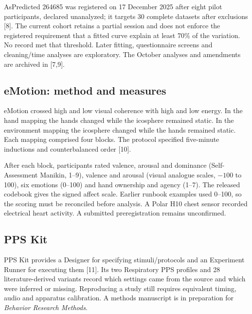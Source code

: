 AsPredicted 264685 was registered on 17 December 2025 after eight pilot participants, declared unanalyzed; it targets 30 complete datasets after exclusions [8]. The current cohort retains a partial session and does not enforce the registered requirement that a fitted curve explain at least 70\% of the variation. No record met that threshold. Later fitting, questionnaire screens and cleaning/time analyses are exploratory. The October analyses and amendments are archived in [7,9].

\subsection{eMotion: method and measures}
\label{sec:s6-methods}
eMotion crossed high and low visual coherence with high and low energy. In the hand mapping the hands changed while the icosphere remained static. In the environment mapping the icosphere changed while the hands remained static. Each mapping comprised four blocks. The protocol specified five-minute inductions and counterbalanced order [10].

After each block, participants rated valence, arousal and dominance (Self-Assessment Manikin, 1--9), valence and arousal (visual analogue scales, $-100$ to 100), six emotions (0--100) and hand ownership and agency (1--7). The released codebook gives the signed affect scale. Earlier runbook examples used 0--100, so the scoring must be reconciled before analysis. A Polar H10 chest sensor recorded electrical heart activity. A submitted preregistration remains unconfirmed.

\subsection{PPS Kit}
PPS Kit provides a Designer for specifying stimuli/protocols and an Experiment Runner for executing them [11]. Its two Respiratory PPS profiles and 28 literature-derived variants record which settings came from the source and which were inferred or missing. Reproducing a study still requires equivalent timing, audio and apparatus calibration. A methods manuscript is in preparation for \emph{Behavior Research Methods}.
